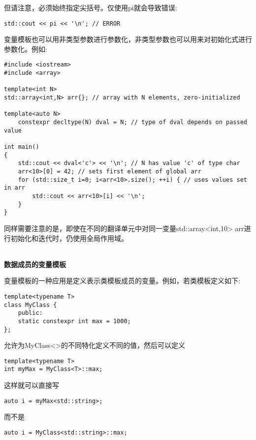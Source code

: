但请注意，必须始终指定尖括号。仅使用pi就会导致错误:

\begin{lstlisting}[style=styleCXX]
std::cout << pi << '\n'; // ERROR
\end{lstlisting}

变量模板也可以用非类型参数进行参数化，非类型参数也可以用来对初始化式进行参数化。例如:

\begin{lstlisting}[style=styleCXX]
#include <iostream>
#include <array>

template<int N>
std::array<int,N> arr{}; // array with N elements, zero-initialized

template<auto N>
	constexpr decltype(N) dval = N; // type of dval depends on passed value

int main()
{
	std::cout << dval<'c'> << '\n'; // N has value 'c' of type char
	arr<10>[0] = 42; // sets first element of global arr
	for (std::size_t i=0; i<arr<10>.size(); ++i) { // uses values set in arr
		std::cout << arr<10>[i] << '\n';
	}
}
\end{lstlisting}

同样需要注意的是，即使在不同的翻译单元中对同一变量std::array<int,10> arr进行初始化和迭代时，仍使用全局作用域。

\hspace*{\fill} \\ %
\noindent
\textbf{数据成员的变量模板}

变量模板的一种应用是定义表示类模板成员的变量。例如，若类模板定义如下:

\begin{lstlisting}[style=styleCXX]
template<typename T>
class MyClass {
	public:
	static constexpr int max = 1000;
};
\end{lstlisting}

允许为MyClass<>的不同特化定义不同的值，然后可以定义

\begin{lstlisting}[style=styleCXX]
template<typename T>
int myMax = MyClass<T>::max;
\end{lstlisting}

这样就可以直接写

\begin{lstlisting}[style=styleCXX]
auto i = myMax<std::string>;
\end{lstlisting}

而不是

\begin{lstlisting}[style=styleCXX]
auto i = MyClass<std::string>::max;
\end{lstlisting}

